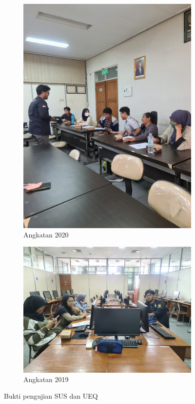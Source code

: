 \begin{figure}[H]
\begin{subfigure}[b]{0.45\textwidth}
	  \includegraphics[width=\linewidth]{contents/appendix/sus3.jpg}
	  \caption{Angkatan 2020}
	  \label{fig:lampiran2}
	\end{subfigure}
    \begin{subfigure}[b]{0.7\textwidth}
		\centering
	  \includegraphics[width=\linewidth]{contents/appendix/sus2.jpg}
	  \caption{Angkatan 2019}
	  \label{fig:lampiran 3}
	\end{subfigure}
	\caption{Bukti pengujian SUS dan UEQ}
	\label{Fig:Lampiraaann}
\end{figure}
\newpage
